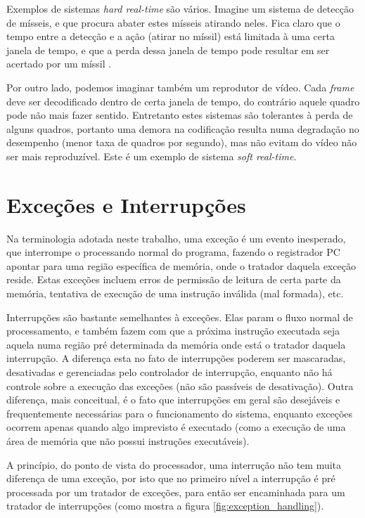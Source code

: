 Exemplos de sistemas \emph{hard real-time} são vários. Imagine um sistema de detecção de mísseis, e que procura abater estes mísseis atirando neles. Fica claro que o tempo entre a detecção e a ação (atirar no míssil) está limitada à uma certa janela de tempo, e que a perda dessa janela de tempo pode resultar em ser acertado por um míssil \cite{realtime}.

Por outro lado, podemos imaginar também um reprodutor de vídeo. Cada \emph{frame} deve ser decodificado dentro de certa janela de tempo, do contrário aquele quadro pode não mais fazer sentido. Entretanto estes sistemas são tolerantes à perda de alguns quadros, portanto uma demora na codificação resulta numa degradação no desempenho (menor taxa de quadros por segundo), mas não evitam do vídeo não ser mais reproduzível. Este é um exemplo de sistema \emph{soft real-time}.

\section{Exceções e Interrupções}
Na terminologia adotada neste trabalho, uma exceção é um evento inesperado, que interrompe o processando normal do programa, fazendo o registrador PC apontar para uma região específica de memória, onde o tratador daquela exceção reside. Estas exceções incluem erros de permissão de leitura de certa parte da memória, tentativa de execução de uma instrução inválida (mal formada), etc.

Interrupções são bastante semelhantes à exceções. Elas param o fluxo normal de processamento, e também fazem com que a próxima instrução executada seja aquela numa região pré determinada da memória onde está o tratador daquela interrupção. A diferença esta no fato de interrupções poderem ser mascaradas, desativadas e gerenciadas pelo controlador de interrupção, enquanto não há controle sobre a execução das exceções (não são passíveis de desativação). Outra diferença, mais conceitual, é o fato que interrupções em geral são desejáveis e frequentemente necessárias para o funcionamento do sistema, enquanto exceções ocorrem apenas quando algo imprevisto é executado (como a execução de uma área de memória que não possui instruções executáveis).

A princípio, do ponto de vista do processador, uma interrução não tem muita diferença de uma exceção, por isto que no primeiro nível a interrupção é pré processada por um tratador de exceções, para então ser encaminhada para um tratador de interrupções (como mostra a figura \ref{fig:exception_handling}).


